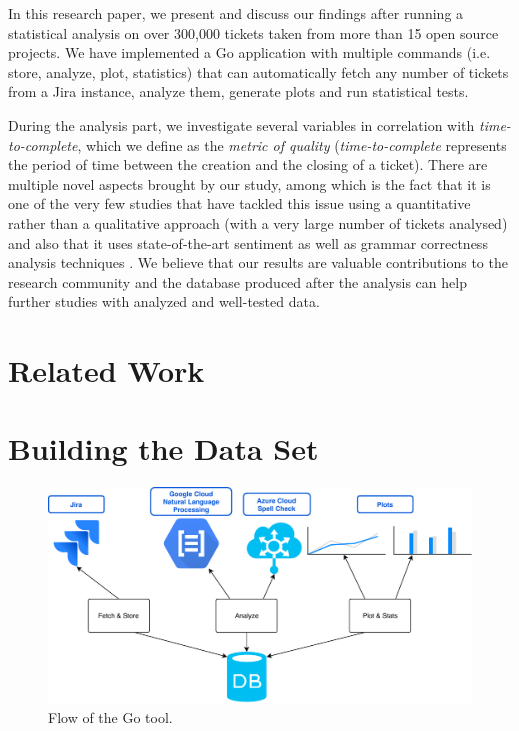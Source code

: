 \documentclass{mpaper}
\begin{document}
In this research paper, we present and discuss our findings after running a statistical analysis 
on over 300,000 tickets taken from more than 15 open source projects. We have implemented a Go application 
with multiple commands (i.e. store, analyze, plot, statistics) that can automatically fetch any number of tickets 
from a Jira instance, analyze them, generate plots and run statistical tests. 

During the analysis part, we investigate several variables in correlation with \emph{time-to-complete}, 
which we define as the \emph{metric of quality} (\emph{time-to-complete} represents the period of time between the creation 
and the closing of a ticket). There are multiple novel aspects brought by our study, among which is the fact that it is one of 
the very few studies that have tackled this issue using a quantitative rather than a qualitative approach (with a very 
large number of tickets analysed) and also that it uses state-of-the-art sentiment \cite{wilson2005recognizing} as well as 
grammar correctness analysis techniques \cite{wilson2005recognizing}. We believe that our results are valuable 
contributions to the research community and the database produced after the analysis can help further studies with 
analyzed and well-tested data.

\section{Related Work}

\section{Building the Data Set}

\begin{figure}
\begin{center}
\includegraphics[width=\textwidth]{images/flow.pdf}
\end{center}
\caption{\label{fig-eg}Flow of the Go tool.}
\end{figure}
\end{document}
